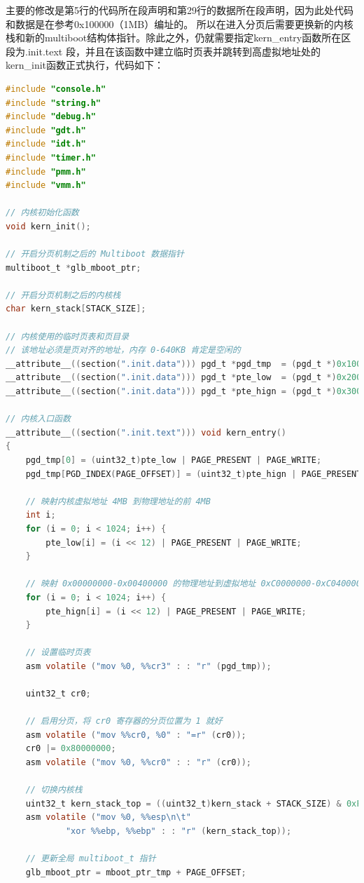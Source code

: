 \par 主要的修改是第5行的代码所在段声明和第29行的数据所在段声明，因为此处代码和数据是在参考0x100000（1MB）编址的。\allowbreak
所以在进入分页后需要更换新的内核栈和新的multiboot结构体指针。除此之外，仍就需要指定kern\_entry函数所在区段为.init.text\allowbreak
段，并且在该函数中建立临时页表并跳转到高虚拟地址处的kern\_init函数正式执行，代码如下：

\begin{lstlisting}[language = C, caption = init/entry.c]
#include "console.h"
#include "string.h"
#include "debug.h"
#include "gdt.h"
#include "idt.h"
#include "timer.h"
#include "pmm.h"
#include "vmm.h"

// 内核初始化函数
void kern_init();

// 开启分页机制之后的 Multiboot 数据指针
multiboot_t *glb_mboot_ptr;

// 开启分页机制之后的内核栈
char kern_stack[STACK_SIZE];

// 内核使用的临时页表和页目录
// 该地址必须是页对齐的地址，内存 0-640KB 肯定是空闲的
__attribute__((section(".init.data"))) pgd_t *pgd_tmp  = (pgd_t *)0x1000;
__attribute__((section(".init.data"))) pgd_t *pte_low  = (pgd_t *)0x2000;
__attribute__((section(".init.data"))) pgd_t *pte_hign = (pgd_t *)0x3000;

// 内核入口函数
__attribute__((section(".init.text"))) void kern_entry()
{
	pgd_tmp[0] = (uint32_t)pte_low | PAGE_PRESENT | PAGE_WRITE;
	pgd_tmp[PGD_INDEX(PAGE_OFFSET)] = (uint32_t)pte_hign | PAGE_PRESENT | PAGE_WRITE;

	// 映射内核虚拟地址 4MB 到物理地址的前 4MB
	int i;
	for (i = 0; i < 1024; i++) {
		pte_low[i] = (i << 12) | PAGE_PRESENT | PAGE_WRITE;
	}

	// 映射 0x00000000-0x00400000 的物理地址到虚拟地址 0xC0000000-0xC0400000
	for (i = 0; i < 1024; i++) {
		pte_hign[i] = (i << 12) | PAGE_PRESENT | PAGE_WRITE;
	}
	
	// 设置临时页表
	asm volatile ("mov %0, %%cr3" : : "r" (pgd_tmp));

	uint32_t cr0;

	// 启用分页，将 cr0 寄存器的分页位置为 1 就好
	asm volatile ("mov %%cr0, %0" : "=r" (cr0));
	cr0 |= 0x80000000;
	asm volatile ("mov %0, %%cr0" : : "r" (cr0));
	
	// 切换内核栈
	uint32_t kern_stack_top = ((uint32_t)kern_stack + STACK_SIZE) & 0xFFFFFFF0;
	asm volatile ("mov %0, %%esp\n\t"
			"xor %%ebp, %%ebp" : : "r" (kern_stack_top));

	// 更新全局 multiboot_t 指针
	glb_mboot_ptr = mboot_ptr_tmp + PAGE_OFFSET;


\end{lstlisting}
